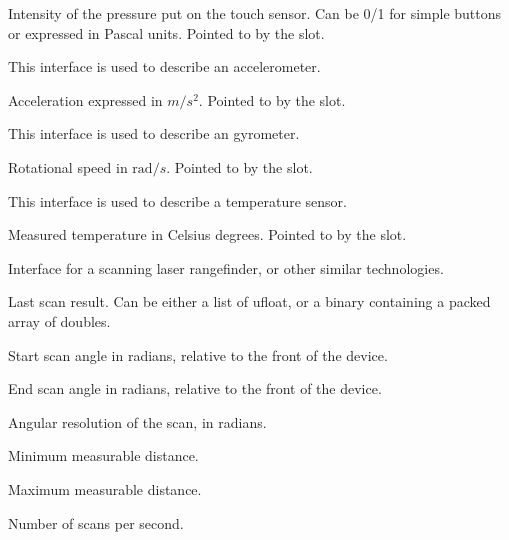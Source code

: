 \begin{slots}
  {%
    Intensity of the pressure put on the touch sensor. Can be 0/1 for
    simple buttons or expressed in Pascal units. Pointed to by the
     slot.%
  }

\end{slots}



This interface is used to describe an accelerometer.

\begin{slots}
  {%
    Acceleration expressed in $m/s^2$.  Pointed to by the 
    slot.%
  }

\end{slots}

This interface is used to describe an gyrometer.

\begin{slots}
  {%
    Rotational speed in $\mathrm{rad}/s$.  Pointed to by the
     slot.%
  }
\end{slots}

This interface is used to describe a temperature sensor.

\begin{slots}
  {%
    Measured temperature in Celsius degrees.  Pointed to by the
     slot.%
  }
\end{slots}

Interface for a scanning laser rangefinder, or other similar technologies.

\begin{slots}
  {%
    Last scan result. Can be either a list of ufloat, or a binary containing
    a packed array of doubles.
  }

  {%
    Start scan angle in radians, relative to the front of the device.%
  }

  {%
    End scan angle in radians, relative to the front of the device.%
  }

  {%
    Angular resolution of the scan, in radians.%
  }

  {%
    Minimum measurable distance.%
  }

  {%
    Maximum measurable distance.%
  }

  {%
    Number of scans per second.%
  }
\end{slots}

